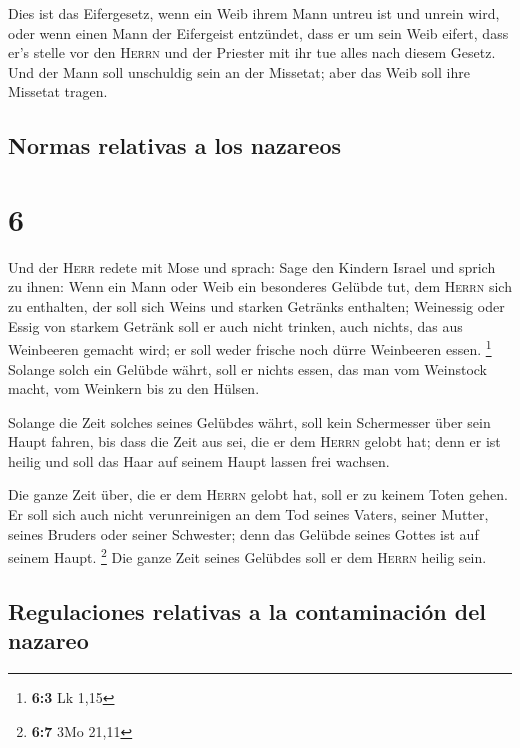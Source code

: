  Dies ist das Eifergesetz, wenn ein Weib ihrem Mann
untreu ist und unrein wird,  oder wenn einen Mann der
Eifergeist entzündet, dass er um sein Weib eifert, dass er's stelle vor
den \textsc{Herrn} und der Priester mit ihr tue alles nach diesem
Gesetz.  Und der Mann soll unschuldig sein an der
Missetat; aber das Weib soll ihre Missetat tragen.

\hypertarget{normas-relativas-a-los-nazareos}{%
\subsection{Normas relativas a los
nazareos}\label{normas-relativas-a-los-nazareos}}

\hypertarget{section-5}{%
\section{6}\label{section-5}}

 Und der \textsc{Herr} redete mit Mose und sprach:
 Sage den Kindern Israel und sprich zu ihnen: Wenn ein
Mann oder Weib ein besonderes Gelübde tut, dem \textsc{Herrn} sich zu
enthalten,  der soll sich Weins und starken Getränks
enthalten; Weinessig oder Essig von starkem Getränk soll er auch nicht
trinken, auch nichts, das aus Weinbeeren gemacht wird; er soll weder
frische noch dürre Weinbeeren essen. \footnote{\textbf{6:3} Lk 1,15}
 Solange solch ein Gelübde währt, soll er nichts essen,
das man vom Weinstock macht, vom Weinkern bis zu den Hülsen.

 Solange die Zeit solches seines Gelübdes währt, soll kein
Schermesser über sein Haupt fahren, bis dass die Zeit aus sei, die er
dem \textsc{Herrn} gelobt hat; denn er ist heilig und soll das Haar auf
seinem Haupt lassen frei wachsen.

 Die ganze Zeit über, die er dem \textsc{Herrn} gelobt
hat, soll er zu keinem Toten gehen.  Er soll sich auch
nicht verunreinigen an dem Tod seines Vaters, seiner Mutter, seines
Bruders oder seiner Schwester; denn das Gelübde seines Gottes ist auf
seinem Haupt. \footnote{\textbf{6:7} 3Mo 21,11}  Die ganze
Zeit seines Gelübdes soll er dem \textsc{Herrn} heilig sein.

\hypertarget{regulaciones-relativas-a-la-contaminaciuxf3n-del-nazareo}{%
\subsection{Regulaciones relativas a la contaminación del
nazareo}\label{regulaciones-relativas-a-la-contaminaciuxf3n-del-nazareo}}

